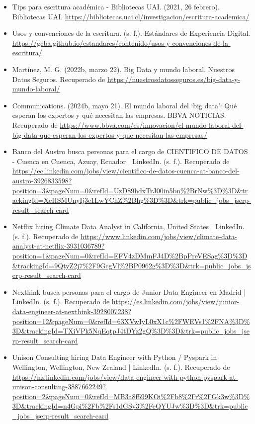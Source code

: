 \documentclass[12pt]{article}
\begin{document}
        \begin{itemize}

            \item Tips para escritura académica - Bibliotecas UAI. (2021, 26 febrero). Bibliotecas UAI. \url{https://bibliotecas.uai.cl/investigacion/escritura-academica/}
            \item Usos y convenciones de la escritura. (s. f.). Estándares de Experiencia Digital. \url{https://gcba.github.io/estandares/contenido/usos-y-convenciones-de-la-escritura/}
            \item Martínez, M. G. (2022b, marzo 22). Big Data y mundo laboral. Nuestros Datos Seguros. Recuperado de {\url{https://nuestrosdatosseguros.es/big-data-y-mundo-laboral/}}
            \item Communications. (2024b, mayo 21). El mundo laboral del ‘big data’: Qué esperan los expertos y qué necesitan las empresas. BBVA NOTICIAS. Recuperado de {\url{https://www.bbva.com/es/innovacion/el-mundo-laboral-del-big-data-que-esperan-los-expertos-y-que-necesitan-las-empresas/}}
            \item Banco del Austro busca personas para el cargo de CIENTIFICO DE DATOS - Cuenca en Cuenca, Azuay, Ecuador | LinkedIn. (s. f.). Recuperado de {\url{https://ec.linkedin.com/jobs/view/cientifico-de-datos-cuenca-at-banco-del-austro-3926833598?position=3&pageNum=0&refId=UzD89hdxTrJ00in5bn\%2BrNw\%3D\%3D&trackingId=XcHSMUnyIj3e1LwYChZ\%2Bhg\%3D\%3D&trk=public_jobs_jserp-result_search-card}}
            \item Netflix hiring Climate Data Analyst in California, United States | LinkedIn. (s. f.). Recuperado de {\url{https://www.linkedin.com/jobs/view/climate-data-analyst-at-netflix-3931036789?position=1&pageNum=0&refId=EFV4zDMmFJ4D\%2BpPreVESag\%3D\%3D&trackingId=9QtyZ2j7\%2F9GcgVl\%2BP0962g\%3D\%3D&trk=public_jobs_jserp-result_search-card}}
            \item Nexthink busca personas para el cargo de Junior Data Engineer en Madrid | LinkedIn. (s. f.). Recuperado de {\url{https://es.linkedin.com/jobs/view/junior-data-engineer-at-nexthink-3928007238?position=12&pageNum=0&refId=63XVwIyL0xX1c%2FWEVs1%2FNA%3D%3D&trackingId=TXiVPk5NqEqtpJ4tDYz2gQ%3D%3D&trk=public_jobs_jserp-result_search-card}}
            \item Unison Consulting hiring Data Engineer with Python / Pyspark in Wellington, Wellington, New Zealand | LinkedIn. (s. f.). Recuperado de {\url{https://nz.linkedin.com/jobs/view/data-engineer-with-python-pyspark-at-unison-consulting-3887662249?position=2&pageNum=0&refId=MB3a8f599KOi%2Fb8%2Fr%2FGk3w%3D%3D&trackingId=n4Gpi%2Fb%2Fs1dGSy3%2FeQYUJw%3D%3D&trk=public_jobs_jserp-result_search-card}}

\end{itemize}
\end{document}

